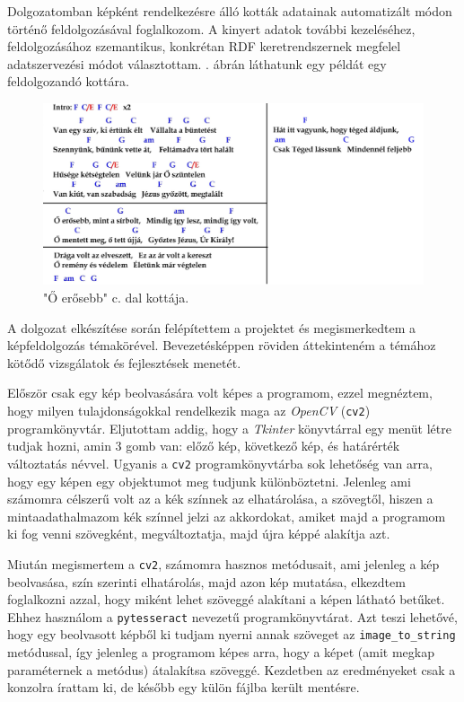 
Dolgozatomban képként rendelkezésre álló kották adatainak automatizált módon történő feldolgozásával foglalkozom. A kinyert adatok további kezeléséhez, feldolgozásához szemantikus, konkrétan RDF keretrendszernek megfelel adatszervezési módot választottam. . ábrán láthatunk egy példát egy feldolgozandó kottára.

\begin{figure}[h]
	\includegraphics[width=\textwidth]{images/samples/O_erosebb.jpg}
	\caption{"Ő erősebb" c. dal kottája.}
	\label{fig:Dal1}
\end{figure}

A dolgozat elkészítése során felépítettem a projektet és megismerkedtem a képfeldolgozás témakörével. Bevezetésképpen röviden áttekinteném a témához kötődő vizsgálatok és fejlesztések menetét.

Először csak egy kép beolvasására volt képes a programom, ezzel megnéztem, hogy milyen tulajdonságokkal rendelkezik maga az \textit{OpenCV} (\texttt{cv2}) programkönyvtár. Eljutottam addig, hogy a \textit{Tkinter} könyvtárral egy menüt létre tudjak hozni, amin 3 gomb van: előző kép, következő kép, és határérték változtatás névvel. Ugyanis a \texttt{cv2} programkönyvtárba sok lehetőség van arra, hogy egy képen egy objektumot meg tudjunk különböztetni. Jelenleg ami számomra célszerű volt az a kék színnek az elhatárolása, a szövegtől, hiszen a mintaadathalmazom kék színnel jelzi az akkordokat, amiket majd a programom ki fog venni szövegként, megváltoztatja, majd újra képpé alakítja azt.

Miután megismertem a \texttt{cv2}, számomra hasznos metódusait, ami jelenleg a kép beolvasása, szín szerinti elhatárolás, majd azon kép mutatása, elkezdtem foglalkozni azzal, hogy miként lehet szöveggé alakítani a képen látható betűket. Ehhez használom a \texttt{pytesseract} nevezetű programkönyvtárat. Azt teszi lehetővé, hogy egy beolvasott képből ki tudjam nyerni annak szöveget az \texttt{image\_to\_string} metódussal, így jelenleg a programom képes arra, hogy a képet (amit megkap paraméternek a metódus) átalakítsa szöveggé. Kezdetben az eredményeket csak a konzolra írattam ki, de később egy külön fájlba került mentésre.

